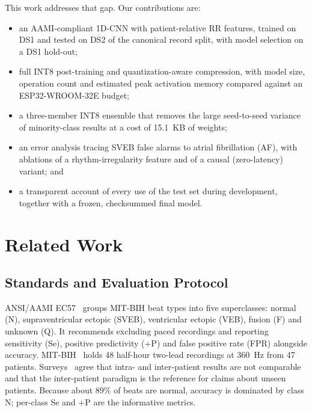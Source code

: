 \documentclass[conference]{IEEEtran}
\begin{document}
This work addresses that gap. Our contributions are:
\begin{itemize}
\item an AAMI-compliant 1D-CNN with patient-relative RR features, trained on DS1 and tested on DS2 of the canonical record split, with model selection on a DS1 hold-out;
\item full INT8 post-training and quantization-aware compression, with model size, operation count and estimated peak activation memory compared against an ESP32-WROOM-32E budget;
\item a three-member INT8 ensemble that removes the large seed-to-seed variance of minority-class results at a cost of 15.1~KB of weights;
\item an error analysis tracing SVEB false alarms to atrial fibrillation (AF), with ablations of a rhythm-irregularity feature and of a causal (zero-latency) variant; and
\item a transparent account of every use of the test set during development, together with a frozen, checksummed final model.
\end{itemize}

\section{Related Work}
\subsection{Standards and Evaluation Protocol}
ANSI/AAMI EC57~\cite{aami2012ec57} groups MIT-BIH beat types into five superclasses: normal (N), supraventricular ectopic (SVEB), ventricular ectopic (VEB), fusion (F) and unknown (Q). It recommends excluding paced recordings and reporting sensitivity (Se), positive predictivity (+P) and false positive rate (FPR) alongside accuracy. MIT-BIH~\cite{moody2001impact,goldberger2000physiobank} holds 48 half-hour two-lead recordings at 360~Hz from 47 patients. Surveys~\cite{xiao2023review,luz2016survey} agree that intra- and inter-patient results are not comparable and that the inter-patient paradigm is the reference for claims about unseen patients. Because about 89\% of beats are normal, accuracy is dominated by class N; per-class Se and +P are the informative metrics.
\end{document}
